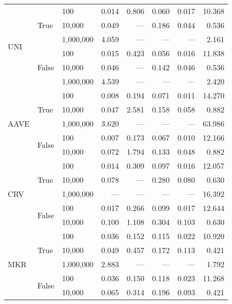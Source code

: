 \begin{tabular}{lllrrrrr}
\cline{2-8}
\multirow{6}{*}{UNI} & \multirow{3}{*}{True} & 100 &    0.014 &   0.806 &  0.060 & 0.017 &   10.368 \\
    &       & 10,000 &    0.049 &     --- &  0.186 & 0.044 &    0.536 \\
    &       & 1,000,000 &    4.059 &     --- &    --- &   --- &    2.161 \\
\cline{2-8}
    & \multirow{3}{*}{False} & 100 &    0.015 &   0.423 &  0.056 & 0.016 &   11.838 \\
    &       & 10,000 &    0.046 &     --- &  0.142 & 0.046 &    0.536 \\
    &       & 1,000,000 &    4.539 &     --- &    --- &   --- &    2.420 \\
\cline{1-8}
\cline{2-8}
\multirow{5}{*}{AAVE} & \multirow{3}{*}{True} & 100 &    0.008 &   0.194 &  0.071 & 0.011 &   14.270 \\
    &       & 10,000 &    0.047 &   2.581 &  0.158 & 0.058 &    0.882 \\
    &       & 1,000,000 &    3.620 &     --- &    --- &   --- &   63.986 \\
\cline{2-8}
    & \multirow{2}{*}{False} & 100 &    0.007 &   0.173 &  0.067 & 0.010 &   12.166 \\
    &       & 10,000 &    0.072 &   1.794 &  0.133 & 0.048 &    0.882 \\
\cline{1-8}
\cline{2-8}
\multirow{5}{*}{CRV} & \multirow{3}{*}{True} & 100 &    0.014 &   0.309 &  0.097 & 0.016 &   12.057 \\
    &       & 10,000 &    0.078 &     --- &  0.280 & 0.080 &    0.630 \\
    &       & 1,000,000 &      --- &     --- &    --- &   --- &   16.392 \\
\cline{2-8}
    & \multirow{2}{*}{False} & 100 &    0.017 &   0.266 &  0.099 & 0.017 &   12.644 \\
    &       & 10,000 &    0.100 &   1.108 &  0.304 & 0.103 &    0.630 \\
\cline{1-8}
\cline{2-8}
\multirow{6}{*}{MKR} & \multirow{3}{*}{True} & 100 &    0.036 &   0.152 &  0.115 & 0.022 &   10.920 \\
    &       & 10,000 &    0.049 &   0.457 &  0.172 & 0.113 &    0.421 \\
    &       & 1,000,000 &    2.883 &     --- &    --- &   --- &    1.792 \\
\cline{2-8}
    & \multirow{3}{*}{False} & 100 &    0.036 &   0.150 &  0.118 & 0.023 &   11.268 \\
    &       & 10,000 &    0.065 &   0.314 &  0.196 & 0.093 &    0.421 \\

\end{tabular}

